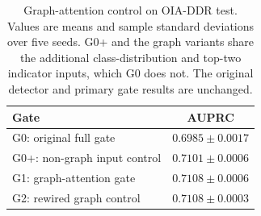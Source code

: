 \begin{table}[htbp]
\centering
\caption{Graph-attention control on OIA-DDR test. Values are means and sample standard deviations over five seeds. G0+ and the graph variants share the additional class-distribution and top-two indicator inputs, which G0 does not. The original detector and primary gate results are unchanged.}
\label{tab:native_gate_control}
\footnotesize
\setlength{\tabcolsep}{3pt}
\begin{tabular}{lc}
\toprule
Gate & AUPRC \\
\midrule
G0: original full gate & $0.6985\pm0.0017$ \\
G0+: non-graph input control & $0.7101\pm0.0006$ \\
G1: graph-attention gate & $0.7108\pm0.0006$ \\
G2: rewired graph control & $0.7108\pm0.0003$ \\
\bottomrule
\end{tabular}
\par{}
\end{table}
